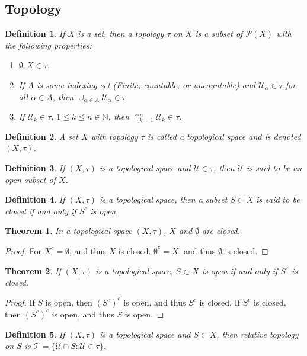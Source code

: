 \documentclass[crop=false,class=book]{standalone}
\theoremstyle{mystyle}
\newtheorem{theorem}{Theorem}[section]
\newtheorem{definition}{Definition}[section]
\begin{document}
\subsection{Topology}
\begin{definition}
If $X$ is a set, then a topology $\tau$ on $X$ is a subset of $\mathcal{P}(X)$ with the following properties:
\begin{enumerate}
\item $\emptyset, X\in \tau$.
\item If $A$ is some indexing set (Finite, countable, or uncountable) and $\mathcal{U}_\alpha \in \tau$ for all $\alpha \in A$, then $\cup_{\alpha \in A} \mathcal{U}_{\alpha} \in \tau$.
\item If $\mathcal{U}_k\in \tau$, $1\leq k \leq n\in \mathbb{N}$, then $\cap_{k=1}^{n}\mathcal{U}_k \in \tau$.
\end{enumerate}
\end{definition}
\begin{definition}
A set $X$ with topology $\tau$ is called a topological space and is denoted $(X,\tau)$.
\end{definition}
\begin{definition}
If $(X,\tau)$ is a topological space and $\mathcal{U}\in \tau$, then $\mathcal{U}$ is said to be an open subset of $X$.
\end{definition}
\begin{definition}
If $(X,\tau)$ is a topological space, then a subset $S\subset X$ is said to be closed if and only if $S^c$ is open.
\end{definition}
\begin{theorem}
In a topological space $(X,\tau)$, $X$ and $\emptyset$ are closed.
\end{theorem}
\begin{proof}
For $X^c = \emptyset$, and thus $X$ is closed. $\emptyset^c=X$, and thus $\emptyset$ is closed.
\end{proof}
\begin{theorem}
If $(X,\tau)$ is a topological space, $S\subset X$ is open if and only if $S^c$ is closed.
\end{theorem}
\begin{proof}
If $S$ is open, then $(S^c)^c$ is open, and thus $S^c$ is closed. If $S^c$ is closed, then $(S^c)^c$ is open, and thus $S$ is open.
\end{proof}
\begin{definition}
If $(X,\tau)$ is a topological space and $S\subset X$, then relative topology on $S$ is $\mathscr{T}=\{\mathcal{U}\cap S:\mathcal{U}\in \tau\}$.
\end{definition}
\end{document}
